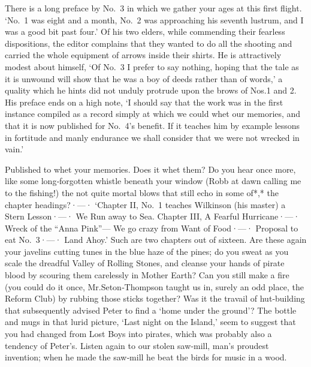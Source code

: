 There is a long preface by No.~3 in which we gather your ages at this first flight.
‘No.~1 was eight and a month,
No.~2 was approaching his seventh lustrum,
and I was a good bit past four.’
Of his two elders, while commending their fearless dispositions,
the editor complains that they wanted to do all the shooting
and carried the whole equipment of arrows inside their shirts.
He is attractively modest about himself,
‘Of No.~3 I prefer to say nothing,
hoping that the tale as it is unwound will show that he was a boy of deeds rather than of words,’
a quality which he hints did not unduly protrude upon the brows of Nos.\@ 1 and 2.
His preface ends on a high note,
‘I should say that the work was in the first instance compiled as a record
simply at which we could whet our memories,
and that it is now published for No.~4’s benefit.
If it teaches him by example lessons in fortitude and manly endurance
we shall consider that we were not wrecked in vain.’

Published to whet your memories.
Does it whet them?
Do you hear once more, like some long‐forgotten whistle beneath your window
(Robb at dawn calling me to the fishing!\@)
the not quite mortal blows that still echo in some of*,* the chapter headings?·—·%
‘Chapter II, No.~1 teaches Wilkinson (his master) a Stern Lesson·—·%
We Run away to Sea.
Chapter III, A Fearful Hurricane·—·%
Wreck of the “Anna Pink”—%
We go crazy from Want of Food·—·%
Proposal to eat No.~3·—·%
Land Ahoy.’
Such are two chapters out of sixteen.
Are these again your javelins cutting tunes in the blue haze of the pines;
do you sweat as you scale the dreadful Valley of Rolling Stones,
and cleanse your hands of pirate blood by scouring them carelessly in Mother Earth?
Can you still make a fire
(you could do it once,
Mr.\@ Seton‐Thompson taught us in, surely an odd place, the Reform Club)
by rubbing those sticks together?
Was it the travail of hut‐building that subsequently advised Peter to find a ‘home under the ground’?
The bottle and mugs in that lurid picture, ‘Last night on the Island,’
seem to suggest that you had changed from Lost Boys into pirates,
which was probably also a tendency of Peter’s.
Listen again to our stolen saw‐mill, man’s proudest invention;
when he made the saw‐mill he beat the birds for music in a wood.

